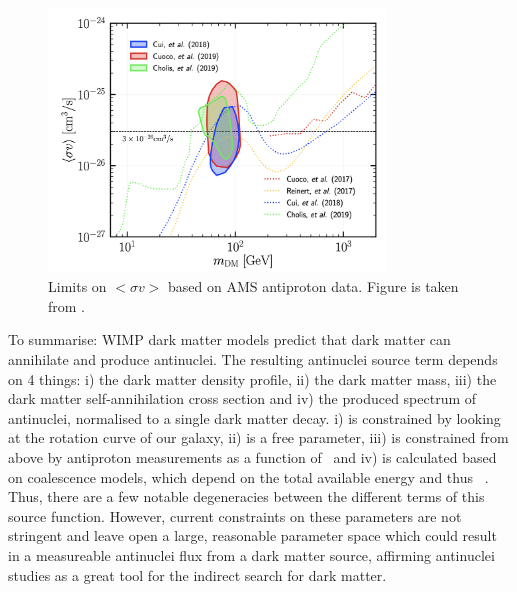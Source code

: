 \begin{figure}[hbtp]
    \centering
    \includegraphics[width=0.8\textwidth]{figures/PbarLimitsAMS.png}
    \caption{Limits on  $<\sigma v>$ based on AMS antiproton data. Figure is taken from \cite{}.}
    \label{fig:DMSigmaVLimits}
\end{figure}

To summarise: WIMP dark matter models predict that dark matter can annihilate and produce antinuclei. The resulting antinuclei source term depends on 4 things: i) the dark matter density profile, ii) the dark matter mass, iii) the dark matter self-annihilation cross section and iv) the produced spectrum of antinuclei, normalised to a single dark matter decay. i) is constrained by looking at the rotation curve of our galaxy, ii) is a free parameter, iii) is constrained from above by antiproton measurements as a function of \dmm\ and iv) is calculated based on coalescence models, which depend on the total available energy and thus \dmm\ . Thus, there are a few notable degeneracies between the different terms of this source function. However, current constraints on these parameters are not stringent and leave open a large, reasonable parameter space which could result in a measureable antinuclei flux from a dark matter source, affirming antinuclei studies as a great tool for the indirect search for dark matter.



